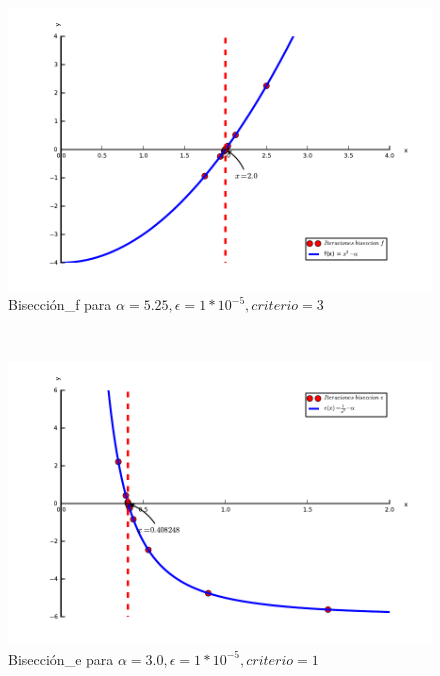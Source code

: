
\begin{figure}[!h]
	\begin{center}
		  \includegraphics[keepaspectratio]{Imagenes/exp1/biseccion_f.pdf}
		  \caption{Bisección\_f para $\alpha=5.25, \epsilon = 1*10^{-5}, criterio = 3$}
		  \label{fig:contra1}
	\end{center}
\end{figure}

~

\begin{figure}[!h]
	\begin{center}
		  \includegraphics[keepaspectratio]{Imagenes/exp1/biseccion_e.pdf}
		  \caption{Bisección\_e para $\alpha=3.0, \epsilon = 1*10^{-5}, criterio = 1$}
		  \label{fig:contra1}
	\end{center}
\end{figure}

